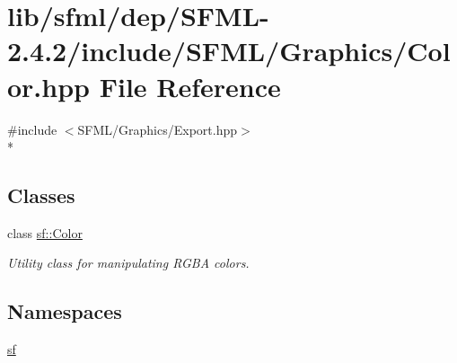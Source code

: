 \hypertarget{lib_2sfml_2dep_2_s_f_m_l-2_84_82_2include_2_s_f_m_l_2_graphics_2_color_8hpp}{\section{lib/sfml/dep/\-S\-F\-M\-L-\/2.4.2/include/\-S\-F\-M\-L/\-Graphics/\-Color.hpp File Reference}
\label{lib_2sfml_2dep_2_s_f_m_l-2_84_82_2include_2_s_f_m_l_2_graphics_2_color_8hpp}
}
{\ttfamily \#include $<$S\-F\-M\-L/\-Graphics/\-Export.\-hpp$>$}\\*
\subsection*{Classes}
\begin{DoxyCompactItemize}
\item 
class \hyperlink{classsf_1_1_color}{sf\-::\-Color}
\begin{DoxyCompactList}\small\item\em Utility class for manipulating R\-G\-B\-A colors. \end{DoxyCompactList}\end{DoxyCompactItemize}
\subsection*{Namespaces}
\begin{DoxyCompactItemize}
\item 
\hyperlink{namespacesf}{sf}
\end{DoxyCompactItemize}
